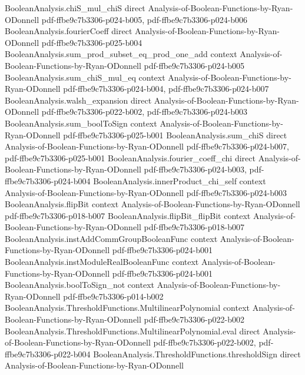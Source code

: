 \begin{theorem}
\proofstep
  {BooleanAnalysis.chiS_mul_chiS}
  {direct}
  {Analysis-of-Boolean-Functions-by-Ryan-ODonnell}
  {pdf-ffbe9c7b3306-p024-b005,
    pdf-ffbe9c7b3306-p024-b006}
\proofstep
  {BooleanAnalysis.fourierCoeff}
  {direct}
  {Analysis-of-Boolean-Functions-by-Ryan-ODonnell}
  {pdf-ffbe9c7b3306-p025-b004}
\proofstep
  {BooleanAnalysis.sum_prod_subset_eq_prod_one_add}
  {context}
  {Analysis-of-Boolean-Functions-by-Ryan-ODonnell}
  {pdf-ffbe9c7b3306-p024-b005}
\proofstep
  {BooleanAnalysis.sum_chiS_mul_eq}
  {context}
  {Analysis-of-Boolean-Functions-by-Ryan-ODonnell}
  {pdf-ffbe9c7b3306-p024-b004,
    pdf-ffbe9c7b3306-p024-b007}
\proofstep
  {BooleanAnalysis.walsh_expansion}
  {direct}
  {Analysis-of-Boolean-Functions-by-Ryan-ODonnell}
  {pdf-ffbe9c7b3306-p022-b002,
    pdf-ffbe9c7b3306-p024-b003}
\proofstep
  {BooleanAnalysis.sum_boolToSign}
  {context}
  {Analysis-of-Boolean-Functions-by-Ryan-ODonnell}
  {pdf-ffbe9c7b3306-p025-b001}
\proofstep
  {BooleanAnalysis.sum_chiS}
  {direct}
  {Analysis-of-Boolean-Functions-by-Ryan-ODonnell}
  {pdf-ffbe9c7b3306-p024-b007,
    pdf-ffbe9c7b3306-p025-b001}
\proofstep
  {BooleanAnalysis.fourier_coeff_chi}
  {direct}
  {Analysis-of-Boolean-Functions-by-Ryan-ODonnell}
  {pdf-ffbe9c7b3306-p024-b003,
    pdf-ffbe9c7b3306-p024-b004}
\proofstep
  {BooleanAnalysis.innerProduct_chi_self}
  {context}
  {Analysis-of-Boolean-Functions-by-Ryan-ODonnell}
  {pdf-ffbe9c7b3306-p024-b003}
\proofstep
  {BooleanAnalysis.flipBit}
  {context}
  {Analysis-of-Boolean-Functions-by-Ryan-ODonnell}
  {pdf-ffbe9c7b3306-p018-b007}
\proofstep
  {BooleanAnalysis.flipBit_flipBit}
  {context}
  {Analysis-of-Boolean-Functions-by-Ryan-ODonnell}
  {pdf-ffbe9c7b3306-p018-b007}
\proofstep
  {BooleanAnalysis.instAddCommGroupBooleanFunc}
  {context}
  {Analysis-of-Boolean-Functions-by-Ryan-ODonnell}
  {pdf-ffbe9c7b3306-p024-b001}
\proofstep
  {BooleanAnalysis.instModuleRealBooleanFunc}
  {context}
  {Analysis-of-Boolean-Functions-by-Ryan-ODonnell}
  {pdf-ffbe9c7b3306-p024-b001}
\proofstep
  {BooleanAnalysis.boolToSign_not}
  {context}
  {Analysis-of-Boolean-Functions-by-Ryan-ODonnell}
  {pdf-ffbe9c7b3306-p014-b002}
\proofstep
  {BooleanAnalysis.ThresholdFunctions.MultilinearPolynomial}
  {context}
  {Analysis-of-Boolean-Functions-by-Ryan-ODonnell}
  {pdf-ffbe9c7b3306-p022-b002}
\proofstep
  {BooleanAnalysis.ThresholdFunctions.MultilinearPolynomial.eval}
  {direct}
  {Analysis-of-Boolean-Functions-by-Ryan-ODonnell}
  {pdf-ffbe9c7b3306-p022-b002,
    pdf-ffbe9c7b3306-p022-b004}
\proofstep
  {BooleanAnalysis.ThresholdFunctions.thresholdSign}
  {direct}
  {Analysis-of-Boolean-Functions-by-Ryan-ODonnell}

\end{theorem}
